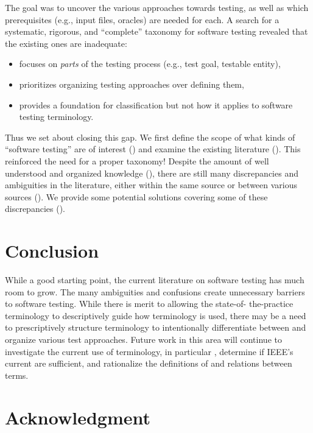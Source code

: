 \documentclass[conference]{IEEEtran}
\begin{document}
The goal was to uncover the various approaches towards testing, as well as
which prerequisites (e.g., input files, oracles) are needed for each.  A search
for a systematic, rigorous, and ``complete'' taxonomy for software testing
revealed that the existing ones are inadequate:

\begin{itemize}
    \item \cite{TebesEtAl2020a} focuses on \emph{parts} of the
          testing process (e.g., test goal, testable entity),
    \item \cite{SouzaEtAl2017} prioritizes organizing testing
          approaches over defining them,
    \item \cite{UnterkalmsteinerEtAl2014} provides a foundation for
          classification but not how it applies to software testing terminology.
\end{itemize}

Thus we set about closing this gap. We first define the scope of what kinds of
``software testing'' are of interest () and examine the existing
literature (). This reinforced the need for a proper taxonomy!
Despite the amount of well understood and organized knowledge (),
there are still many discrepancies and ambiguities in the literature, either
within the same source or between various sources (). We provide
some potential solutions covering some of these discrepancies ().







\section{Conclusion}

While a good starting point, the current literature on software testing has
much room to grow. The many ambiguities and confusions create unnecessary
barriers to software testing. While there is merit to allowing the state-of-%
the-practice terminology to descriptively guide how terminology is used, there
may be a need to prescriptively structure terminology to intentionally
differentiate between and organize various test approaches. Future work in this
area will continue to investigate the current use of terminology, in
particular , determine if IEEE's current
 are sufficient, and rationalize the definitions of
and relations between terms.

\section*{Acknowledgment}


\newpage



\end{document}
